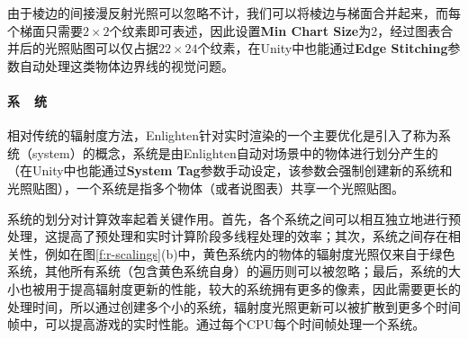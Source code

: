 由于棱边的间接漫反射光照可以忽略不计，我们可以将棱边与梯面合并起来，而每个梯面只需要$2\times 2$个纹素即可表述，因此设置\textbf{Min Chart Size}为2，经过图表合并后的光照贴图可以仅占据$22\times 24$个纹素，在Unity中也能通过\textbf{Edge Stitching}参数自动处理这类物体边界线的视觉问题。




\paragraph{系~~统}
相对传统的辐射度方法，Enlighten针对实时渲染的一个主要优化是引入了称为系统（system）的概念，系统是由Enlighten自动对场景中的物体进行划分产生的（在Unity中也能通过\textbf{System Tag}参数手动设定，该参数会强制创建新的系统和光照贴图），一个系统是指多个物体（或者说图表）共享一个光照贴图。

系统的划分对计算效率起着关键作用。首先，各个系统之间可以相互独立地进行预处理，这提高了预处理和实时计算阶段多线程处理的效率；其次，系统之间存在相关性，例如在图\ref{f:r-scalings}(b)中，黄色系统内的物体的辐射度光照仅来自于绿色系统，其他所有系统（包含黄色系统自身）的遍历则可以被忽略；最后，系统的大小也被用于提高辐射度更新的性能，较大的系统拥有更多的像素，因此需要更长的处理时间，所以通过创建多个小的系统，辐射度光照更新可以被扩散到更多个时间帧中，可以提高游戏的实时性能。通过每个CPU每个时间帧处理一个系统。

